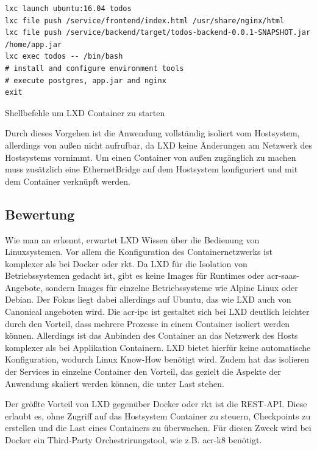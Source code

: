 \begin{listing}[h]
	\begin{verbatim}
lxc launch ubuntu:16.04 todos
lxc file push /service/frontend/index.html /usr/share/nginx/html
lxc file push /service/backend/target/todos-backend-0.0.1-SNAPSHOT.jar /home/app.jar
lxc exec todos -- /bin/bash
# install and configure environment tools
# execute postgres, app.jar and nginx
exit
	\end{verbatim}
	\caption{Shellbefehle um LXD Container zu starten}
	\label{lst:lxdConfig}
\end{listing}

Durch dieses Vorgehen ist die Anwendung vollständig isoliert vom Hostsystem, allerdings von außen nicht aufrufbar, da LXD keine Änderungen am Netzwerk des Hostsystems vornimmt. Um einen Container von außen zugänglich zu machen muss zusätzlich eine EthernetBridge auf dem Hostsystem konfiguriert und mit dem Container verknüpft werden.

\subsection{Bewertung}
\label{sec:compLXDBewertung}
Wie man an  erkennt, erwartet LXD Wissen über die Bedienung von Linuxsystemen. Vor allem die Konfiguration des Containernetzwerks ist komplexer als bei Docker oder rkt. Da LXD für die Isolation von Betriebssystemen gedacht ist, gibt es keine Images für Runtimes oder \gls{acr-saas}-Angebote, sondern Images für einzelne Betriebssysteme wie Alpine Linux oder Debian. Der Fokus liegt dabei allerdings auf Ubuntu, das wie LXD auch von Canonical angeboten wird. Die \gls{acr-ipc} ist gestaltet sich bei LXD deutlich leichter durch den Vorteil, dass mehrere Prozesse in einem Container isoliert werden können. Allerdings ist das Anbinden des Container an das Netzwerk des Hosts komplexer als bei Applikation Containern. LXD bietet hierfür keine automatische Konfiguration, wodurch Linux Know-How benötigt wird. Zudem hat das isolieren der Services in einzelne Container den Vorteil, das gezielt die Aspekte der Anwendung skaliert werden können, die unter Last stehen.

Der größte Vorteil von LXD gegenüber Docker oder rkt ist die REST-API. Diese erlaubt es, ohne Zugriff auf das Hostsystem Container zu steuern, Checkpoints zu erstellen und die Last eines Containers zu überwachen. Für diesen Zweck wird bei Docker ein Third-Party Orchestrirungstool, wie z.B. \gls{acr-k8} benötigt.

